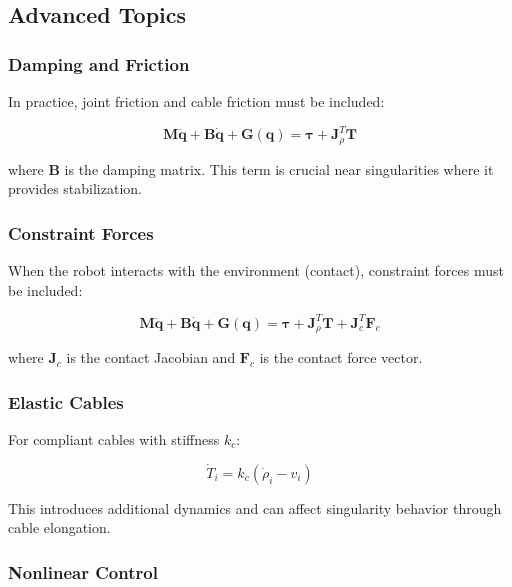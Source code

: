 \subsection{Advanced Topics}

\subsubsection{Damping and Friction}

In practice, joint friction and cable friction must be included:

\begin{equation}
\mathbf{M} \ddot{\mathbf{q}} + \mathbf{B} \dot{\mathbf{q}} + \mathbf{G}(\mathbf{q}) = \boldsymbol{\tau} + \mathbf{J}_{\rho}^T \mathbf{T}
\end{equation}

where $\mathbf{B}$ is the damping matrix. This term is crucial near singularities where it provides stabilization.

\subsubsection{Constraint Forces}

When the robot interacts with the environment (contact), constraint forces must be included:

\begin{equation}
\mathbf{M} \ddot{\mathbf{q}} + \mathbf{B} \dot{\mathbf{q}} + \mathbf{G}(\mathbf{q}) = \boldsymbol{\tau} + \mathbf{J}_{\rho}^T \mathbf{T} + \mathbf{J}_c^T \mathbf{F}_c
\end{equation}

where $\mathbf{J}_c$ is the contact Jacobian and $\mathbf{F}_c$ is the contact force vector.

\subsubsection{Elastic Cables}

For compliant cables with stiffness $k_c$:

\begin{equation}
\dot{T}_i = k_c (\dot{\rho}_i - v_i)
\end{equation}

This introduces additional dynamics and can affect singularity behavior through cable elongation.

\subsubsection{Nonlinear Control}

